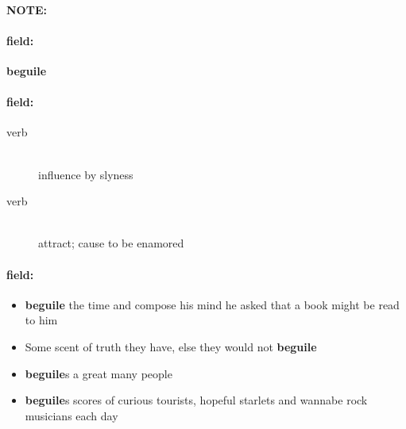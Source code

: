 \documentclass[12pt]{article}
\newenvironment{note}{\paragraph{NOTE:}}{}
\newenvironment{field}{\paragraph{field:}}{}
\begin{document}
\begin{note}
\begin{field}
\textbf{\large beguile}
\end{field}


\begin{field}
\begin{description}
\item[verb] \hfill \\ 
influence by slyness

\item[verb] \hfill \\ 
attract; cause to be enamored

\end{description}
\end{field}

\begin{field}
\begin{itemize}
\item \textbf{beguile} the time and compose his mind he asked that a book might be read to him
\item Some scent of truth they have, else they would not \textbf{beguile}
\item \textbf{beguile}s a great many people
\item \textbf{beguile}s scores of curious tourists, hopeful starlets and wannabe rock musicians each day
\end{itemize}
\end{field}
\end{note}
\end{document}
